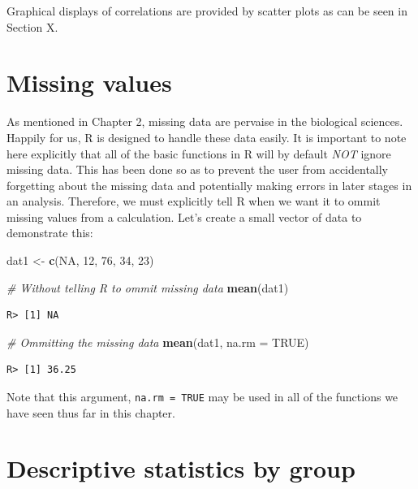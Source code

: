 \documentclass[english,10pt,a4paper,oneside]{book}
\newenvironment{Shaded}{\begin{snugshade}}{\end{snugshade}}
\newcommand{\KeywordTok}[1]{\textcolor[rgb]{0.13,0.29,0.53}{\textbf{#1}}}
\newcommand{\DataTypeTok}[1]{\textcolor[rgb]{0.13,0.29,0.53}{#1}}
\newcommand{\DecValTok}[1]{\textcolor[rgb]{0.00,0.00,0.81}{#1}}
\newcommand{\StringTok}[1]{\textcolor[rgb]{0.31,0.60,0.02}{#1}}
\newcommand{\CommentTok}[1]{\textcolor[rgb]{0.56,0.35,0.01}{\textit{#1}}}
\newcommand{\OtherTok}[1]{\textcolor[rgb]{0.56,0.35,0.01}{#1}}
\newcommand{\NormalTok}[1]{#1}
\theoremstyle{definition}
\theoremstyle{definition}
\theoremstyle{definition}
\theoremstyle{remark}
\begin{document}
Graphical displays of correlations are provided by scatter plots as can
be seen in Section X.

\section{Missing values}\label{missing-values-1}

As mentioned in Chapter 2, missing data are pervaise in the biological
sciences. Happily for us, R is designed to handle these data easily. It
is important to note here explicitly that all of the basic functions in
R will by default \emph{NOT} ignore missing data. This has been done so
as to prevent the user from accidentally forgetting about the missing
data and potentially making errors in later stages in an analysis.
Therefore, we must explicitly tell R when we want it to ommit missing
values from a calculation. Let's create a small vector of data to
demonstrate this:

\begin{Shaded}
\begin{Highlighting}[]
\NormalTok{dat1 <-}\StringTok{ }\KeywordTok{c}\NormalTok{(}\OtherTok{NA}\NormalTok{, }\DecValTok{12}\NormalTok{, }\DecValTok{76}\NormalTok{, }\DecValTok{34}\NormalTok{, }\DecValTok{23}\NormalTok{)}

\CommentTok{# Without telling R to ommit missing data}
\KeywordTok{mean}\NormalTok{(dat1)}
\end{Highlighting}
\end{Shaded}

\begin{verbatim}
R> [1] NA
\end{verbatim}

\begin{Shaded}
\begin{Highlighting}[]
\CommentTok{# Ommitting the missing data}
\KeywordTok{mean}\NormalTok{(dat1, }\DataTypeTok{na.rm =} \OtherTok{TRUE}\NormalTok{)}
\end{Highlighting}
\end{Shaded}

\begin{verbatim}
R> [1] 36.25
\end{verbatim}

Note that this argument, \texttt{na.rm\ =\ TRUE} may be used in all of
the functions we have seen thus far in this chapter.

\section{Descriptive statistics by
group}\label{descriptive-statistics-by-group}
\end{document}
